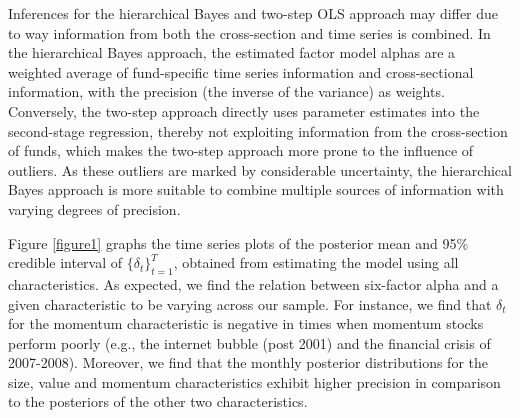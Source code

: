  \par Inferences for the hierarchical Bayes and two-step OLS approach may differ due to way information from both the cross-section and time series is combined. In the hierarchical Bayes approach, the estimated factor model alphas are a weighted average of fund-specific time series information and cross-sectional information, with the precision (the inverse of the variance) as weights. Conversely, the two-step approach directly uses parameter estimates into the second-stage regression, thereby not exploiting information from the cross-section of funds, which makes the two-step approach more prone to the influence of outliers. As these outliers are marked by considerable uncertainty, the hierarchical Bayes
approach is more suitable to combine multiple sources of information with varying degrees of precision.
\par Figure \ref{figure1} graphs the time series plots of the posterior mean and 95\% credible interval of $\{\delta_t\}^T_{t=1}$, obtained from estimating the model using all characteristics. As expected, we find the relation between six-factor alpha and a given characteristic to be varying across our sample. For instance, we find that $\delta_t$ for the momentum characteristic is negative in times when momentum stocks perform poorly (e.g., the internet bubble (post 2001) and the financial crisis of 2007-2008). Moreover, we find that the monthly posterior distributions for the size, value and momentum characteristics exhibit higher precision in comparison to the posteriors of the other two characteristics. 

